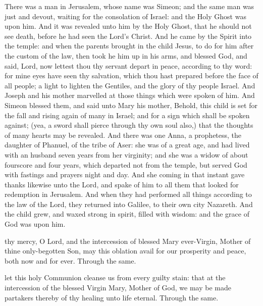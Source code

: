  There was a man in Jerusalem, whose name was Simeon; and the same man was just and devout, waiting for the consolation of Israel: and the Holy Ghost was upon him. And it was revealed unto him by the Holy Ghost, that he should not see death, before he had seen the Lord’s Christ. And he came by the Spirit into the temple: and when the parents brought in the child Jesus, to do for him after the custom of the law, then took he him up in his arms, and blessed God, and said, Lord, now lettest thou thy servant depart in peace, according to thy word: for mine eyes have seen thy salvation, which thou hast prepared before the face of all people; a light to lighten the Gentiles, and the glory of thy people Israel. And Joseph and his mother marvelled at those things which were spoken of him. And Simeon blessed them, and said unto Mary his mother, Behold, this child is set for the fall and rising again of many in Israel; and for a sign which shall be spoken against; (yea, a sword shall pierce through thy own soul also,) that the thoughts of many hearts may be revealed. And there was one Anna, a prophetess, the daughter of Phanuel, of the tribe of Aser: she was of a great age, and had lived with an husband seven years from her virginity; and she was a widow of about fourscore and four years, which departed not from the temple, but served God with fastings and prayers night and day. And she coming in that instant gave thanks likewise unto the Lord, and spake of him to all them that looked for redemption in Jerusalem. And when they had performed all things according to the law of the Lord, they returned into Galilee, to their own city Nazareth. And the child grew, and waxed strong in spirit, filled with wisdom: and the grace of God was upon him.


\secret
{} thy mercy, O Lord, and the intercession of blessed Mary ever-Virgin, Mother of thine only-begotten Son, may this oblation avail for our prosperity and peace, both now and for ever. Through the same.


\postcommunion
{} let this holy Communion cleanse us from every guilty stain: that at the intercession of the blessed Virgin Mary, Mother of God, we may be made partakers thereby of thy healing unto life eternal. Through the same.


